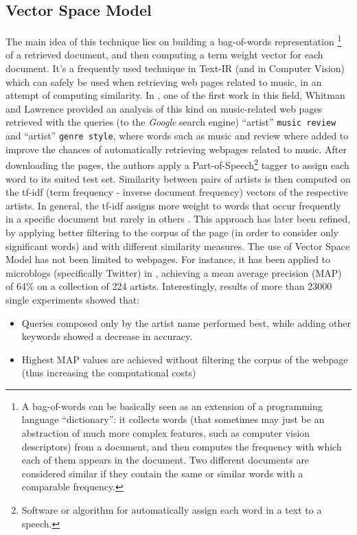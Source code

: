 \subsection{Vector Space Model} 
The main idea of this technique lies on building a bag-of-words representation \footnote{A bag-of-words can be basically seen as an extension of a programming language ``dictionary'': it collects words (that sometimes may just be an abstraction of much more complex features, such as computer vision descriptors) from a document, and then computes the frequency with which each of them appears in the document. Two different documents are considered similar if they contain the same or similar words with a comparable frequency.} of a retrieved document, and then computing a term weight vector for each document. It's a frequently used technique in Text-IR (and in Computer Vision) which can safely be used when retrieving web pages related to music, in an attempt of computing similarity. In \cite{whitman02}, one of the first work in this field, Whitman and Lawrence provided an analysis of this kind on music-related web pages retrieved with the queries (to the \textit{Google} search engine) ``artist'' \texttt{music review} and ``artist'' \texttt{genre style}, where words such as music and review where added to improve the chances of automatically retrieving webpages related to music. After downloading the pages, the authors apply a Part-of-Speech\footnote{Software or algorithm for automatically assign each word in a text to a speech.} tagger to assign each word to its suited test set. Similarity between pairs of artists is then computed on the tf-idf (term frequency - inverse document frequency) vectors of the respective artists. In general, the tf-idf assigns more weight to words that occur frequently in a specific document but rarely in others \cite{musicdatamining}. This approach has later been refined, by applying better filtering to the corpus of the page (in order to consider only significant words) and with different similarity measures. The use of Vector Space Model has not been limited to webpages. For instance, it has been applied to microblogs (specifically Twitter) in \cite{schedl12}, achieving a mean average precision (MAP) of 64\% on a collection of 224 artists. Interestingly, results of more than 23000 single experiments showed that:
\begin{itemize}
\item Queries composed only by the artist name performed best, while adding other keywords showed a decrease in accuracy.
\item Highest MAP values are achieved without filtering the corpus of the webpage (thus increasing the computational costs)
\end{itemize}

